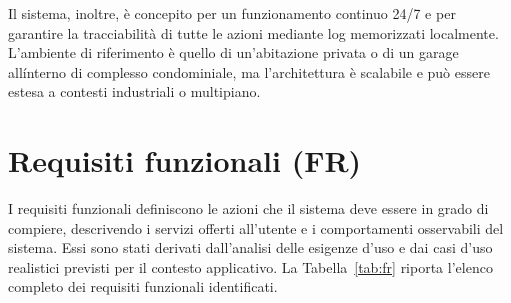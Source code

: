 Il sistema, inoltre, è concepito per un funzionamento continuo 24/7 e per garantire la tracciabilità di tutte le azioni mediante log memorizzati localmente.  
L’ambiente di riferimento è quello di un’abitazione privata o di un garage allínterno di complesso condominiale, ma l’architettura è scalabile e può essere estesa a contesti industriali o multipiano.

\section{Requisiti funzionali (FR)}
I requisiti funzionali definiscono le azioni che il sistema deve essere in grado di compiere, descrivendo i servizi offerti all’utente e i comportamenti osservabili del sistema.  
Essi sono stati derivati dall’analisi delle esigenze d’uso e dai casi d’uso realistici previsti per il contesto applicativo.  
La Tabella~\ref{tab:fr} riporta l’elenco completo dei requisiti funzionali identificati.

